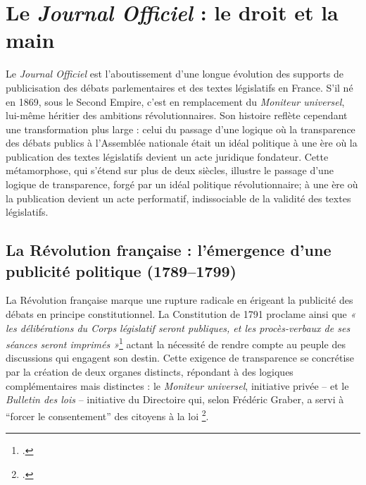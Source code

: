 \section{Le \emph{Journal Officiel} : le droit et la main}

Le \emph{Journal Officiel} est l’aboutissement d’une longue évolution des supports de publicisation des débats parlementaires et des textes législatifs en France. S'il né en 1869, sous le Second Empire, c'est en remplacement du \emph{Moniteur universel}, lui-même héritier des ambitions révolutionnaires. Son histoire reflète cependant une transformation plus large : celui du passage d’une logique où la transparence des débats publics à l'Assemblée nationale était un idéal politique à une ère où la publication des textes législatifs devient un acte juridique fondateur. Cette métamorphose, qui s’étend sur plus de deux siècles, illustre le passage d’une logique de transparence, forgé par un idéal politique révolutionnaire; à une ère où la publication devient un acte performatif, indissociable de la validité des textes législatifs.

\subsection{La Révolution française : l’émergence d’une publicité politique (1789–1799)}

La Révolution française marque une rupture radicale en érigeant la publicité des débats en principe constitutionnel. La Constitution de 1791 proclame ainsi que \emph{« les délibérations du Corps législatif seront publiques, et les procès-verbaux de ses séances seront imprimés »}\footcite[][]{constitution} actant la nécessité de rendre compte au peuple des discussions qui engagent son destin. Cette exigence de transparence se concrétise par la création de deux organes distincts, répondant à des logiques complémentaires mais distinctes : le \emph{Moniteur universel}, initiative privée -- et le \emph{Bulletin des lois} -- initiative du Directoire qui, selon Frédéric Graber, a servi à \enquote{forcer le consentement} des citoyens à la loi \footcite[][]{graber}. 

